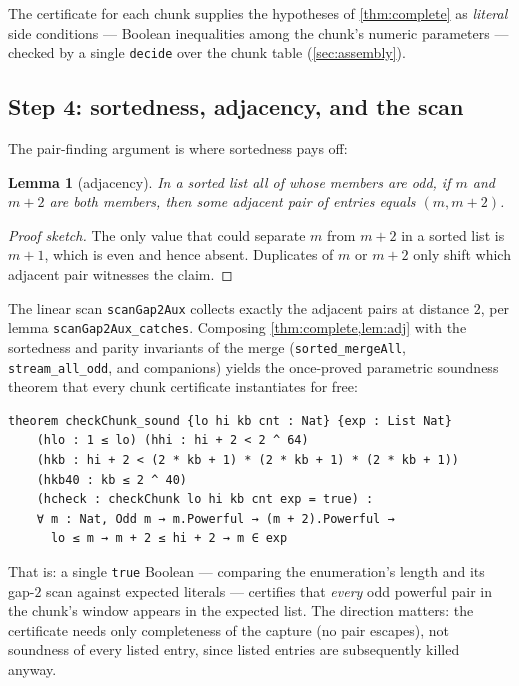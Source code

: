 \documentclass[11pt]{article}
\newtheorem{lemma}[theorem]{Lemma}
\theoremstyle{definition}
\theoremstyle{remark}
\newcommand{\code}[1]{\texttt{#1}}
\begin{document}
The certificate for each chunk supplies the hypotheses of
\cref{thm:complete} as \emph{literal} side conditions --- Boolean
inequalities among the chunk's numeric parameters --- checked by a single
\code{decide} over the chunk table (\cref{sec:assembly}).

\subsection{Step 4: sortedness, adjacency, and the scan}\label{sec:sorted}

The pair-finding argument is where sortedness pays off:

\begin{lemma}[adjacency]\label{lem:adj}
In a sorted list all of whose members are odd, if $m$ and $m+2$ are both
members, then some \emph{adjacent} pair of entries equals $(m, m{+}2)$.
\end{lemma}

\begin{proof}[Proof sketch]
The only value that could separate $m$ from $m+2$ in a sorted list is
$m+1$, which is even and hence absent. Duplicates of $m$ or $m+2$ only
shift which adjacent pair witnesses the claim.
\end{proof}

The linear scan \code{scanGap2Aux} collects exactly the adjacent pairs
at distance $2$, per lemma \code{scanGap2Aux\_catches}. Composing
\cref{thm:complete,lem:adj} with the sortedness and parity invariants of
the merge (\code{sorted\_mergeAll}, \code{stream\_all\_odd}, and
companions) yields
the once-proved parametric soundness theorem that every chunk certificate
instantiates for free:

\begin{lstlisting}
theorem checkChunk_sound {lo hi kb cnt : Nat} {exp : List Nat}
    (hlo : 1 ≤ lo) (hhi : hi + 2 < 2 ^ 64)
    (hkb : hi + 2 < (2 * kb + 1) * (2 * kb + 1) * (2 * kb + 1))
    (hkb40 : kb ≤ 2 ^ 40)
    (hcheck : checkChunk lo hi kb cnt exp = true) :
    ∀ m : Nat, Odd m → m.Powerful → (m + 2).Powerful →
      lo ≤ m → m + 2 ≤ hi + 2 → m ∈ exp
\end{lstlisting}

That is: a single \code{true} Boolean --- comparing the enumeration's
length and its gap-$2$ scan against expected literals --- certifies that
\emph{every} odd powerful pair in the chunk's window appears in the
expected list. The direction matters: the certificate needs only
completeness of the capture (no pair escapes), not soundness of every
listed entry, since listed entries are subsequently killed anyway.
\end{document}
